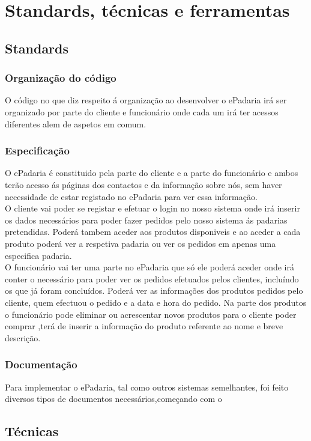 \chapter{Standards, técnicas e ferramentas}
\label{standards_tecnicas_ferramentas}

\section{Standards}
\subsection{Organização do código}
O código no que diz respeito á organização ao desenvolver o ePadaria irá ser organizado por parte do cliente e funcionário onde cada um irá ter acessos diferentes alem de aspetos em comum.
\subsection{Especificação}
O ePadaria é constituido pela parte do cliente e a parte do funcionário e ambos terão acesso ás páginas dos contactos e da informação sobre nós, sem haver necessidade de estar registado no ePadaria para ver essa informação.\\
O cliente vai poder se registar e efetuar o login no nosso sistema onde irá inserir os dados necessários para poder fazer pedidos pelo nosso sistema ás padarias pretendidas. Poderá tambem aceder aos produtos disponiveis e ao aceder a cada produto poderá ver a respetiva padaria ou ver os pedidos em apenas uma especifica padaria. \\
O funcionário vai ter uma parte no ePadaria que só ele poderá aceder onde irá conter o necessário para poder ver os pedidos efetuados pelos clientes, incluíndo os que já foram concluídos. Poderá ver as informações dos produtos pedidos pelo cliente, quem efectuou o pedido e a data e hora do pedido. Na parte dos produtos o funcionário pode eliminar ou acrescentar novos produtos para o cliente poder comprar ,terá de inserir a informação do produto referente ao nome e breve descrição.

\subsection{Documentação}
Para implementar o ePadaria, tal como outros sistemas semelhantes, foi feito diversos tipos de documentos necessários,começando com o


\section{Técnicas}

